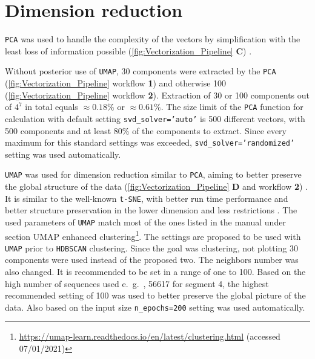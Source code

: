 \section{Dimension reduction} \label{sec:PCA}

\texttt{PCA} was used to handle the complexity of the vectors by simplification with the least loss of information possible (\autoref{fig:Vectorization_Pipeline} \textsf{\textbf{C}}) \autocite{pearson_liii_1901} \autocite{pedregosa_scikit-learn_2011}.

\vspace{1em}

Without posterior use of \texttt{UMAP}, 30 components were extracted by the \texttt{PCA} (\autoref{fig:Vectorization_Pipeline} workflow \textsf{\textbf{1}}) and otherwise 100 (\autoref{fig:Vectorization_Pipeline} workflow \textsf{\textbf{2}}). Extraction of 30 or 100 components out of $4^7$ in total equals $\approx 0.18\%$ or $\approx 0.61\%$. The size limit of the \texttt{PCA} function for calculation with default setting \texttt{svd\_solver='auto'} is 500 different vectors, with 500 components and at least 80\% of the components to extract. Since every maximum for this standard settings was exceeded, \texttt{svd\_solver='randomized'} setting was used automatically. %

\vspace{1em}

\texttt{UMAP} was used for dimension reduction similar to \texttt{PCA}, aiming to better preserve the global structure of the data (\autoref{fig:Vectorization_Pipeline} \textsf{\textbf{D}} and workflow \textsf{\textbf{2}}) \autocite{mcinnes_umap_2020}. It is similar to the well-known \texttt{t-SNE}, with better run time performance and better structure preservation in the lower dimension and less restrictions \autocite{maaten_visualizing_2008, mcinnes_umap_2020}. %
The used parameters of \texttt{UMAP} match most of the ones listed in the manual under section \glqq UMAP enhanced clustering\grqq{}\footnote{\url{https://umap-learn.readthedocs.io/en/latest/clustering.html} (accessed 07/01/2021)}. The settings are proposed to be used with \texttt{UMAP} prior to \texttt{HDBSCAN} clustering. Since the goal was clustering, not plotting 30 components were used instead of the proposed two. The neighbors number was also changed. It is recommended to be set in a range of one to 100. Based on the high number of sequences used e.~g.~, 56617 for segment 4, the highest recommended setting of 100 was used to better preserve the global picture of the data. Also based on the input size \texttt{n\_epochs=200} setting was used automatically.

